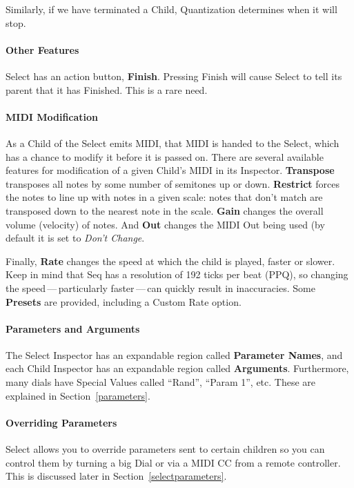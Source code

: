 \documentclass[twoside,10pt]{article}
\begin{document}
Similarly, if we have terminated a Child, Quantization determines when it will stop.

\paragraph{Other Features}

Select has an action button, {\bf Finish}.  Pressing Finish will cause Select to tell its parent that it has Finished.  This is a rare need.


\paragraph{MIDI Modification}

As a Child of the Select emits MIDI, that MIDI is handed to the Select, which has a chance to modify it before it is passed on.  There are several available features for modification of a given Child's MIDI in its Inspector.  {\bf Transpose} transposes all notes by some number of semitones up or down.  {\bf Restrict} forces the notes to line up with notes in a given scale: notes that don't match are transposed down to the nearest note in the scale.  {\bf Gain} changes the overall volume (velocity) of notes.  And {\bf Out} changes the MIDI Out being used (by default it is set to {\it Don't Change}.

Finally, {\bf Rate} changes the speed at which the child is played, faster or slower.  Keep in mind that Seq has a resolution of 192 ticks per beat (PPQ), so changing the speed\,---\,particularly faster\,---\,can quickly result in inaccuracies.    Some {\bf Presets} are provided, including a Custom Rate option.


\paragraph{Parameters and Arguments}

The Select Inspector has an expandable region called {\bf Parameter Names}, and each Child Inspector has an expandable region called {\bf Arguments}. Furthermore, many dials have Special Values called ``Rand'', ``Param 1'', etc.  These are explained in Section~\ref{parameters}.

\paragraph{Overriding Parameters}
Select allows you to override parameters sent to certain children so you can control them by turning a big Dial or via a MIDI CC from a remote controller.  This is discussed later in Section~\ref{selectparameters}.
\end{document}
